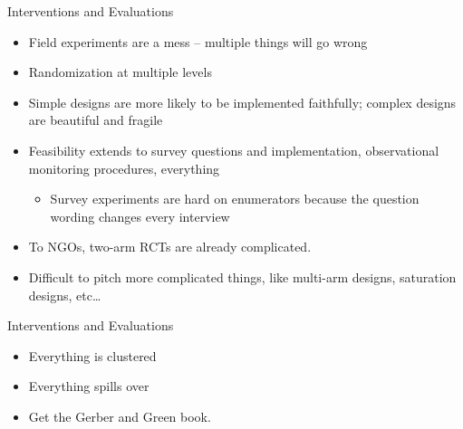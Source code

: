 \documentclass[
  ignorenonframetext,
]{beamer}
\providecommand{\tightlist}{%
  \setlength{\itemsep}{0pt}\setlength{\parskip}{0pt}}
\begin{document}
\begin{frame}{Interventions and Evaluations}
\protect\hypertarget{interventions-and-evaluations-1}{}
\begin{itemize}
\tightlist
\item
  Field experiments are a mess -- multiple things will go wrong
\item
  Randomization at multiple levels
\item
  Simple designs are more likely to be implemented faithfully; complex
  designs are beautiful and fragile
\item
  Feasibility extends to survey questions and implementation,
  observational monitoring procedures, everything

  \begin{itemize}
  \tightlist
  \item
    Survey experiments are hard on enumerators because the question
    wording changes every interview
  \end{itemize}
\end{itemize}

\smallskip

\begin{itemize}
\tightlist
\item
  To NGOs, two-arm RCTs are already complicated.\\
\item
  Difficult to pitch more complicated things, like multi-arm designs,
  saturation designs, etc\ldots{}
\end{itemize}
\end{frame}

\begin{frame}{Interventions and Evaluations}
\protect\hypertarget{interventions-and-evaluations-2}{}
\begin{itemize}
\tightlist
\item
  Everything is clustered
\item
  Everything spills over
\end{itemize}

\bigskip

\begin{itemize}
\tightlist
\item
  Get the Gerber and Green book.
\end{itemize}
\end{frame}
\end{document}
